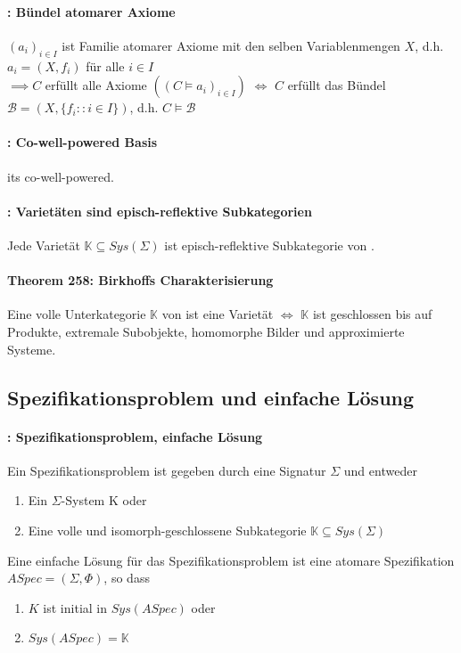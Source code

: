 \paragraph{: Bündel atomarer Axiome} 

$(a_i)_{i \in I}$ ist Familie atomarer Axiome mit den selben Variablenmengen $X$, d.h. $a_i = (X, f_i)$ für alle $i \in I$ \\ 
$\implies C $ erfüllt alle Axiome $((C \models a_i )_{i \in I})$ $\Leftrightarrow$ $C$ erfüllt das Bündel $\mathcal{B} = (X, \{f_i:: i \in I \})$, d.h. $C \models \mathcal{B}$ 

\paragraph{: Co-well-powered Basis} 
\syssig its co-well-powered.


\paragraph{: Varietäten sind episch-reflektive Subkategorien}
Jede Varietät $\mathbb{K} \subseteq Sys(\Sigma)$ ist episch-reflektive Subkategorie von \syssig.

\paragraph{Theorem 258: Birkhoffs Charakterisierung}
Eine volle Unterkategorie $\mathbb{K}$ von \syssig ist eine Varietät $\Leftrightarrow $ $\mathbb{K}$ ist geschlossen bis auf Produkte, extremale Subobjekte, homomorphe Bilder und approximierte Systeme. 
 
 
\newpage  
\subsection{Spezifikationsproblem und einfache Lösung}

\paragraph{: Spezifikationsproblem, einfache Lösung}
Ein Spezifikationsproblem ist gegeben durch eine Signatur $\Sigma$ und entweder 
\begin{enumerate}
\item Ein $\Sigma$-System K oder
\item Eine volle und isomorph-geschlossene Subkategorie $\mathbb{K} \subseteq Sys(\Sigma)$ 
\end{enumerate}
Eine einfache Lösung für das Spezifikationsproblem ist eine atomare Spezifikation $ASpec = (\Sigma, \Phi)$, so dass 
\begin{enumerate}
\item $K$ ist initial in $Sys(ASpec)$ oder
\item $Sys(ASpec) = \mathbb{K}$
\end{enumerate}


